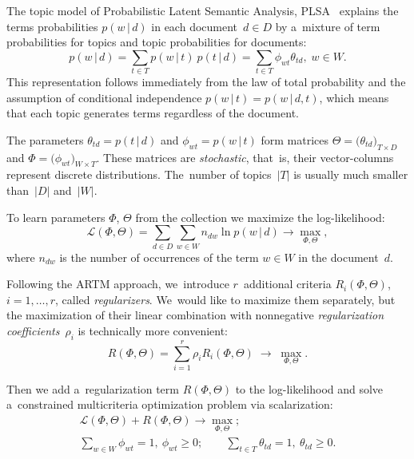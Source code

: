 \documentclass{acm_proc_article-sp}
\newcommand{\cond}{\mspace{3mu}{|}\mspace{3mu}}
\newcommand{\cL}{\mathscr{L}}
\begin{document}
The topic model of Probabilistic Latent Semantic Analysis, PLSA~\cite{hofmann99plsi}
explains the terms probabilities $p(w\cond d)$ in each document~${d\in D}$
by a~mixture of term probabilities for topics and topic probabilities for documents:
\[
    p(w\cond d)
    = \sum_{t\in T} p(w\cond t)\: p(t\cond d)
    = \sum_{t\in T} \phi_{wt} \theta_{td},\;
    w\in W.
\]
This representation follows immediately from the law of total probability
and the assumption of conditional independence $p(w\cond t) = p(w\cond d,t)$,
which means that each topic generates terms regardless of the document.

The parameters
${\theta_{td}=p(t\cond d)}$ and ${\phi_{wt}=p(w\cond t)}$
form matrices
${\Theta = \bigl( \theta_{td} \bigr)_{T\times D}}$ and
${\Phi = \bigl( \phi_{wt} \bigr)_{W\times T}}$.
These matrices are \emph{stochastic},
that~is, their vector-columns represent discrete distributions.
The~number of topics~$|T|$ is usually much smaller than~$|D|$ and~$|W|$.

To learn parameters $\Phi$, $\Theta$ from the collection
we maximize the log-likelihood:
\[
    \cL (\Phi,\Theta) =
    \sum_{d\in D}\sum_{w\in W} n_{dw} \ln p(w\cond d)
    \to \max_{\Phi,\Theta},
\]
where
$n_{dw}$ is the number of occurrences of the term ${w\in W}$ in the document~$d$.

Following the ARTM approach,
we~introduce $r$~additional criteria
$R_i(\Phi,\Theta)$,\; ${i=1,\dots,r}$,
called \emph{regularizers}.
We~would like to maximize them separately,
but the maximization of their linear combination
with nonnegative \emph{regularization coefficients}~$\rho_i$
is technically more convenient:
\[
    R(\Phi,\Theta) =
    \sum_{i=1}^r \rho_i R_i(\Phi,\Theta)
    \;\to\; \max_{\Phi,\Theta}.
\]

Then we add a~regularization term $R(\Phi,\Theta)$ to the log-likelihood
and solve a~constrained multicriteria optimization problem via scalarization:
\begin{gather}
\label{eq:ARTM}
    \cL (\Phi,\Theta) + R(\Phi,\Theta) \to \max_{\Phi,\Theta};
\\\label{eq:ARTM:norm}
    \sum_{w\in W}\!\!\! \phi_{wt} = 1,~
    \phi_{wt}\geq 0;
    \qquad
    \sum_{t\in T} \theta_{td} = 1,~
    \theta_{td}\geq 0.
\end{gather}
\end{document}
